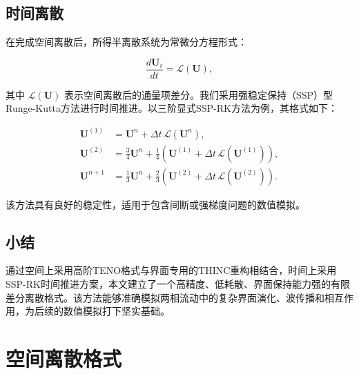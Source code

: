 \documentclass{article}
\numberwithin{equation}{section}    %
\begin{document}
\subsection{时间离散}

在完成空间离散后，所得半离散系统为常微分方程形式：

\begin{equation}
\frac{d \mathbf{U}_i}{d t} = \mathcal{L}(\mathbf{U}),
\end{equation}

其中 $\mathcal{L}(\mathbf{U})$ 表示空间离散后的通量项差分。我们采用强稳定保持（SSP）型Runge-Kutta方法进行时间推进。以三阶显式SSP-RK方法为例，其格式如下：

\begin{align}
\mathbf{U}^{(1)} &= \mathbf{U}^n + \Delta t \, \mathcal{L}(\mathbf{U}^n), \\
\mathbf{U}^{(2)} &= \frac{3}{4} \mathbf{U}^n + \frac{1}{4} \left( \mathbf{U}^{(1)} + \Delta t \, \mathcal{L}(\mathbf{U}^{(1)}) \right), \\
\mathbf{U}^{n+1} &= \frac{1}{3} \mathbf{U}^n + \frac{2}{3} \left( \mathbf{U}^{(2)} + \Delta t \, \mathcal{L}(\mathbf{U}^{(2)}) \right).
\end{align}

该方法具有良好的稳定性，适用于包含间断或强梯度问题的数值模拟。

\subsection{小结}

通过空间上采用高阶TENO格式与界面专用的THINC重构相结合，时间上采用SSP-RK时间推进方案，本文建立了一个高精度、低耗散、界面保持能力强的有限差分离散格式。该方法能够准确模拟两相流动中的复杂界面演化、波传播和相互作用，为后续的数值模拟打下坚实基础。

\section{空间离散格式}
\end{document}
